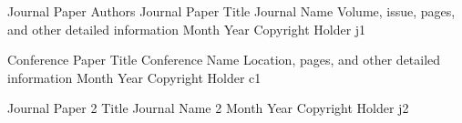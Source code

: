 \documentclass[dissertation,draft]{aaltoseries}
\begin{document}











\errata

\addpublication
{Journal Paper Authors}
{Journal Paper Title}
{Journal Name}
{Volume, issue, pages, and other detailed information}
{Month}
{Year}
{Copyright Holder}
{j1}

{Conference Paper Title}
{Conference Name}
{Location, pages, and other detailed information}
{Month}
{Year}
{Copyright Holder}
{c1}

{Journal Paper 2 Title}
{Journal Name 2}
{}
{Month}
{Year}
{Copyright Holder}
{j2}
\end{document}
